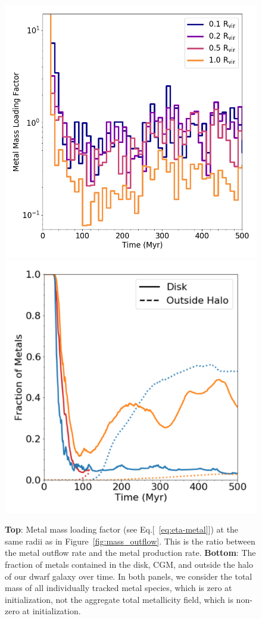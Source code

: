 \documentclass[fleqn,usenatbib,useAMS]{mnras}
\begin{document}
\begin{figure}
\includegraphics[width=0.9\linewidth]{metal_mass_loading} \\
\includegraphics[width=0.9\linewidth]{metal_retention}
\caption{{\bf Top}: Metal mass loading factor (see Eq.[~\ref{eq:eta-metal}]) at the same radii as in Figure~\ref{fig:mass_outflow}. This is the ratio between the metal outflow rate and the metal production rate. {\bf Bottom}: The fraction of metals contained in the disk, CGM, and outside the halo of our dwarf galaxy over time. In both panels, we consider the total mass of all individually tracked metal species, which is zero at initialization, not the aggregate total metallicity field, which is non-zero at initialization.}
\label{fig:metal_evolution}
\end{figure}
\end{document}
